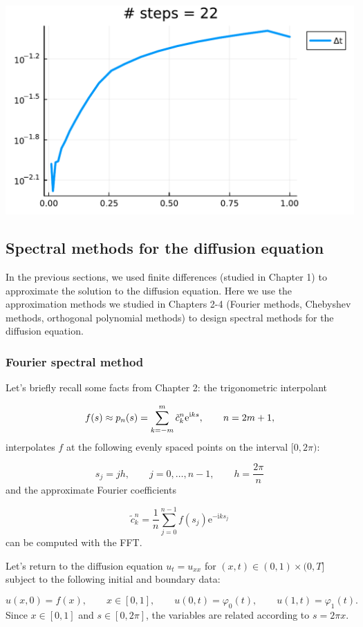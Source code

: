 \documentclass[12pt,a4paper]{article}
\begin{document}
\includegraphics[width=\linewidth]{jl_Vz6qXN/Chapter5_29_1.pdf}

\subsection{Spectral methods for the diffusion equation}
In the previous sections, we used finite differences (studied in Chapter 1) to approximate the solution to the diffusion equation. Here we use the approximation methods we studied in Chapters 2-4 (Fourier methods, Chebyshev methods, orthogonal polynomial methods) to design spectral methods for the diffusion equation.

\subsubsection{Fourier spectral method}
Let's briefly recall some facts from Chapter 2: the trigonometric interpolant

\[
f(s) \approx p_n(s) = \sum_{k=-m}^{m}\tilde{c}^n_k {\rm e}^{{\rm i}ks}, \qquad n = 2m + 1, 
\]
interpolates $f$ at the following evenly spaced points on the interval $[0, 2\pi)$:

\[
s_j = j h,\qquad j = 0, \ldots, n-1, \qquad h = \frac{2\pi}{n}
\]
and the approximate Fourier coefficients

\[
\tilde{c}^n_k   =\frac{1}{n}\sum_{j = 0}^{n-1} f(s_j)\mathrm{e}^{-\mathrm{i}ks_j} 
\]
can be computed with the FFT.

Let's return to the diffusion equation $u_t = u_{xx}$ for $(x,t) \in (0,1)\times(0,T]$ subject to the following initial and boundary data:

\[
u(x,0) = f(x), \qquad x \in [0, 1], \qquad u(0,t) = \varphi_0(t), \qquad u(1,t) = \varphi_1(t).
\]
Since $x \in [0, 1]$ and $s \in [0, 2\pi]$, the variables are related according to $s = 2\pi x$.
\end{document}
